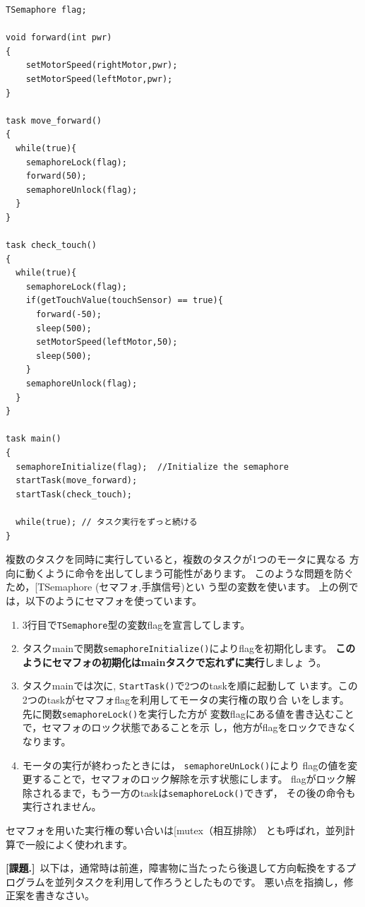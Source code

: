 \documentclass[11pt]{jsarticle}
\makeatletter
\newcounter{wnum}[section]
\def\thewnum{課題\thesection.\the\c@wnum}
\def\work{\refstepcounter{wnum}%
  \vspace{3mm}\noindent\textbf{[\thewnum]}~}
\def\bfindex{\@ifnextchar[{\@bfindex}{\@@bfindex}}
\def\@bfindex[#1]#2{\textbf{#2}\index{#1@#2}}
\def\@@bfindex#1{\textbf{#1}\index{#1}}
\makeatother
\begin{document}
\begin{lstlisting}
TSemaphore flag;

void forward(int pwr)
{
    setMotorSpeed(rightMotor,pwr);
    setMotorSpeed(leftMotor,pwr);
}

task move_forward()
{
  while(true){
    semaphoreLock(flag);
    forward(50);
    semaphoreUnlock(flag);
  }
}

task check_touch()
{
  while(true){
    semaphoreLock(flag);
    if(getTouchValue(touchSensor) == true){
      forward(-50);
      sleep(500);
      setMotorSpeed(leftMotor,50);
      sleep(500);
    }
    semaphoreUnlock(flag);
  }
}

task main()
{
  semaphoreInitialize(flag);  //Initialize the semaphore
  startTask(move_forward);
  startTask(check_touch);

  while(true); // タスク実行をずっと続ける
}
\end{lstlisting}


複数のタスクを同時に実行していると，複数のタスクが1つのモータに異なる
方向に動くように命令を出してしまう可能性があります。 
このような問題を防ぐため，\bfindex{TSemaphore} (セマフォ,手旗信号)とい
う型の変数を使います。
上の例では，以下のようにセマフォを使っています。
\begin{enumerate}
\item {}
3行目で\verb|TSemaphore|型の変数flagを宣言してします。
\item 
{}
タスクmainで関数\verb|semaphoreInitialize()|によりflagを初期化します。
\textbf{このようにセマフォの初期化はmainタスクで忘れずに実行}しましょ
う。
\item タスクmainでは次に, \verb|StartTask()|で2つのtaskを順に起動して
  います。この2つのtaskがセマフォflagを利用してモータの実行権の取り合
  いをします。
  先に関数\verb|semaphoreLock()|を実行した方が 
  変数flagにある値を書き込むことで，セマフォのロック状態であることを示
  し，他方がflagをロックできなくなります。
\item モータの実行が終わったときには，
  \verb|semaphoreUnLock()|により
  flagの値を変更することで，セマフォのロック解除を示す状態にします。
  flagがロック解除されるまで，もう一方のtaskは\verb|semaphoreLock()|できず，
  その後の命令も実行されません。
\end{enumerate}
セマフォを用いた実行権の奪い合いは\bfindex{mutex}（相互排除）
とも呼ばれ，並列計算で一般によく使われます。

\work 以下は，通常時は前進，障害物に当たったら後退して方向転換をするプ
ログラムを並列タスクを利用して作ろうとしたものです。
悪い点を指摘し，修正案を書きなさい。
\end{document}
